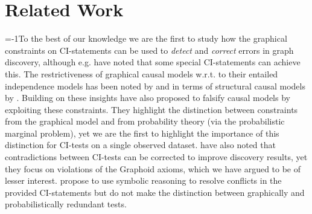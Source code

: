 \section{Related Work}
\looseness=-1To the best of our knowledge we are the first to study how the graphical constraints on CI-statements can be used to \emph{detect} and \emph{correct} errors in graph discovery, although e.g.  \citet{ramsey2006adjacency,colombo2014order} have noted that some special CI-statements can achieve this.
The restrictiveness of graphical causal models w.r.t. to their entailed independence models has been noted by \citet{tsamardinos2012towards,janzing2023reinterpreting} and in terms of structural causal models by \citet{gresele2022causal}.
Building on these insights \citet{faller2024self,schkoda2024cross} have also proposed to falsify causal models by exploiting these constraints.
They highlight the distinction between constraints from the graphical model and from probability theory (via the probabilistic marginal problem),
yet we are the first to highlight the importance of this distinction for CI-tests on a single observed dataset.
\citet{bromberg2009improving} have also noted that contradictions between CI-tests can be corrected to improve discovery results, yet they focus on violations of the Graphoid axioms, which we have argued to be of lesser interest.
\citet{russo2024argumentative} propose to use symbolic reasoning to resolve conflicts in the provided CI-statements but do not make the distinction between graphically and probabilistically redundant tests.



